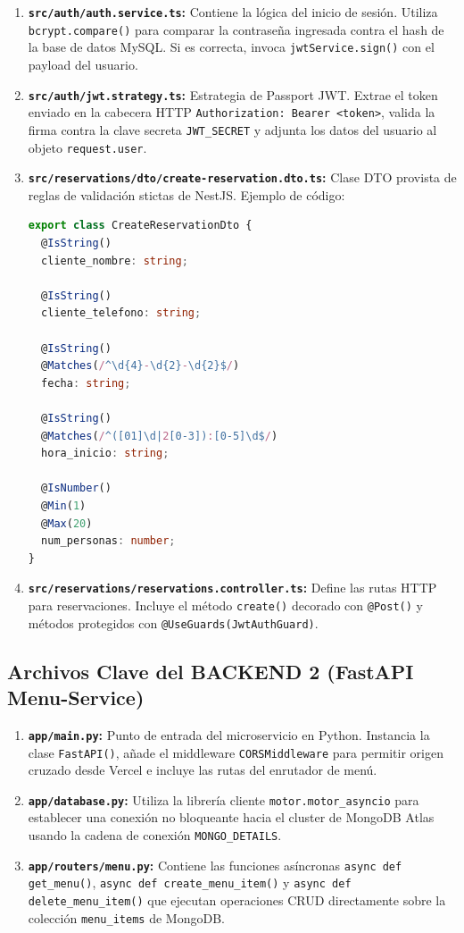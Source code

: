 \documentclass[12pt,a4paper]{article}
\begin{document}
\begin{enumerate}[leftmargin=*]
  \item \textbf{\texttt{src/auth/auth.service.ts}:} Contiene la lógica del inicio de sesión. Utiliza \texttt{bcrypt.compare()} para comparar la contraseña ingresada contra el hash de la base de datos MySQL. Si es correcta, invoca \texttt{jwtService.sign()} con el payload del usuario.
  \item \textbf{\texttt{src/auth/jwt.strategy.ts}:} Estrategia de Passport JWT. Extrae el token enviado en la cabecera HTTP \texttt{Authorization: Bearer <token>}, valida la firma contra la clave secreta \texttt{JWT\_SECRET} y adjunta los datos del usuario al objeto \texttt{request.user}.
  \item \textbf{\texttt{src/reservations/dto/create-reservation.dto.ts}:} Clase DTO provista de reglas de validación stictas de NestJS. Ejemplo de código:
\begin{lstlisting}[language=TypeScript]
export class CreateReservationDto {
  @IsString()
  cliente_nombre: string;

  @IsString()
  cliente_telefono: string;

  @IsString()
  @Matches(/^\d{4}-\d{2}-\d{2}$/)
  fecha: string;

  @IsString()
  @Matches(/^([01]\d|2[0-3]):[0-5]\d$/)
  hora_inicio: string;

  @IsNumber()
  @Min(1)
  @Max(20)
  num_personas: number;
}
\end{lstlisting}
  \item \textbf{\texttt{src/reservations/reservations.controller.ts}:} Define las rutas HTTP para reservaciones. Incluye el método \texttt{create()} decorado con \texttt{@Post()} y métodos protegidos con \texttt{@UseGuards(JwtAuthGuard)}.
\end{enumerate}

\subsection{Archivos Clave del BACKEND 2 (FastAPI Menu-Service)}

\begin{enumerate}[leftmargin=*]
  \item \textbf{\texttt{app/main.py}:} Punto de entrada del microservicio en Python. Instancia la clase \texttt{FastAPI()}, añade el middleware \texttt{CORSMiddleware} para permitir origen cruzado desde Vercel e incluye las rutas del enrutador de menú.
  \item \textbf{\texttt{app/database.py}:} Utiliza la librería cliente \texttt{motor.motor\_asyncio} para establecer una conexión no bloqueante hacia el cluster de MongoDB Atlas usando la cadena de conexión \texttt{MONGO\_DETAILS}.
  \item \textbf{\texttt{app/routers/menu.py}:} Contiene las funciones asíncronas \texttt{async def get\_menu()}, \texttt{async def create\_menu\_item()} y \texttt{async def delete\_menu\_item()} que ejecutan operaciones CRUD directamente sobre la colección \texttt{menu\_items} de MongoDB.
\end{enumerate}
\end{document}
